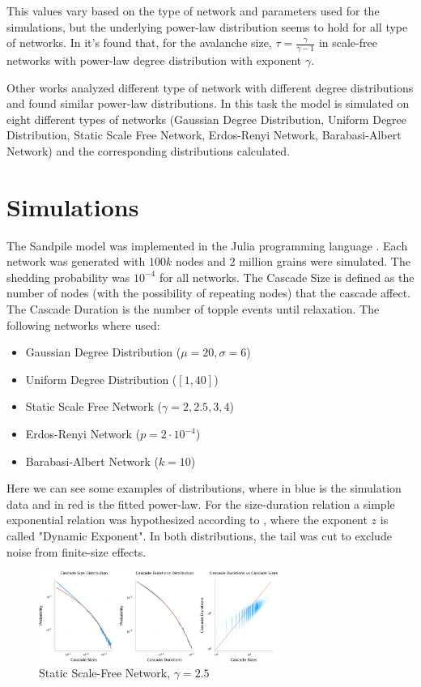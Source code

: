 This values vary based on the type of network and parameters used for the simulations, but the underlying power-law distribution seems to hold for all type of networks.
In \cite{scale_free_sandpile} it's found that, for the avalanche size, $\tau = \frac{\gamma}{\gamma -1}$ in scale-free networks with power-law degree distribution with exponent $\gamma$.

Other works \cite{random_graph_sandpile} analyzed different type of network with different degree distributions and found similar power-law distributions.
In this task the model is simulated on eight different types of networks (Gaussian Degree Distribution, Uniform Degree Distribution, Static Scale Free Network, Erdos-Renyi Network, Barabasi-Albert Network) and the corresponding distributions calculated.

\section{Simulations}

The Sandpile model was implemented in the Julia programming language \cite{julia}. Each network was generated with $100k$ nodes and $2$ million grains were simulated. The shedding probability was $10^{-4}$ for all networks. The Cascade Size is defined as the number of nodes (with the possibility of repeating nodes) that the cascade affect. The Cascade Duration is the number of topple events until relaxation.
The following networks where used:
\begin{itemize}
    \item Gaussian Degree Distribution ($\mu = 20, \sigma = 6$)
    \item Uniform Degree Distribution ($[1,40]$)
    \item Static Scale Free Network ($\gamma = 2, 2.5, 3, 4$) \cite{scale_free_generation}
    \item Erdos-Renyi Network ($p = 2\cdot 10^{-4}$)
    \item Barabasi-Albert Network ($k = 10$)
\end{itemize}

Here we can see some examples of distributions, where in blue is the simulation data and in red is the fitted power-law. For the size-duration relation a simple exponential relation was hypothesized according to \cite{scale_free_sandpile}, where the exponent $z$ is called "Dynamic Exponent".
In both distributions, the tail was cut to exclude noise from finite-size effects.
    \begin{figure}[H]
        \centering
        \includegraphics[width=0.7\textwidth]{images/Task15/StaticScaleFree25.png}
        \caption{Static Scale-Free Network, $\gamma = 2.5$}
    \end{figure}
    
